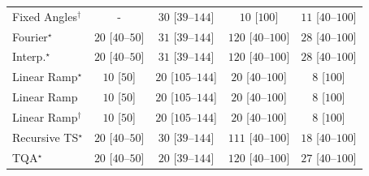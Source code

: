 \begin{tabular}{l|cccc|}
Fixed Angles$^\dagger$ & {\cellcolor[HTML]{000000}} \color[HTML]{F1F1F1} {\cellcolor{white}} \color{black} - & {\cellcolor[HTML]{F3FAF0}} \color[HTML]{000000} $30$ [$39$--$144$] & {\cellcolor[HTML]{F7FCF5}} \color[HTML]{000000} $10$ [$100$] & {\cellcolor[HTML]{F6FCF4}} \color[HTML]{000000} $11$ [$40$--$100$] \\
Fourier$^\star$ & {\cellcolor[HTML]{F5FBF2}} \color[HTML]{000000} $20$ [$40$--$50$] & {\cellcolor[HTML]{F3FAF0}} \color[HTML]{000000} $31$ [$39$--$144$] & {\cellcolor[HTML]{E0F3DB}} \color[HTML]{000000} $120$ [$40$--$100$] & {\cellcolor[HTML]{F4FBF1}} \color[HTML]{000000} $28$ [$40$--$100$] \\
Interp.$^\star$ & {\cellcolor[HTML]{F5FBF2}} \color[HTML]{000000} $20$ [$40$--$50$] & {\cellcolor[HTML]{F3FAF0}} \color[HTML]{000000} $31$ [$39$--$144$] & {\cellcolor[HTML]{E0F3DB}} \color[HTML]{000000} $120$ [$40$--$100$] & {\cellcolor[HTML]{F4FBF1}} \color[HTML]{000000} $28$ [$40$--$100$] \\
Linear Ramp$^\star$ & {\cellcolor[HTML]{F7FCF5}} \color[HTML]{000000} $10$ [$50$] & {\cellcolor[HTML]{F5FBF2}} \color[HTML]{000000} $20$ [$105$--$144$] & {\cellcolor[HTML]{F5FBF2}} \color[HTML]{000000} $20$ [$40$--$100$] & {\cellcolor[HTML]{F7FCF5}} \color[HTML]{000000} $8$ [$100$] \\
Linear Ramp & {\cellcolor[HTML]{F7FCF5}} \color[HTML]{000000} $10$ [$50$] & {\cellcolor[HTML]{F5FBF2}} \color[HTML]{000000} $20$ [$105$--$144$] & {\cellcolor[HTML]{F5FBF2}} \color[HTML]{000000} $20$ [$40$--$100$] & {\cellcolor[HTML]{F7FCF5}} \color[HTML]{000000} $8$ [$100$] \\
Linear Ramp$^\dagger$ & {\cellcolor[HTML]{F7FCF5}} \color[HTML]{000000} $10$ [$50$] & {\cellcolor[HTML]{F5FBF2}} \color[HTML]{000000} $20$ [$105$--$144$] & {\cellcolor[HTML]{F5FBF2}} \color[HTML]{000000} $20$ [$40$--$100$] & {\cellcolor[HTML]{F7FCF5}} \color[HTML]{000000} $8$ [$100$] \\
Recursive TS$^\star$ & {\cellcolor[HTML]{F5FBF2}} \color[HTML]{000000} $20$ [$40$--$50$] & {\cellcolor[HTML]{F3FAF0}} \color[HTML]{000000} $30$ [$39$--$144$] & {\cellcolor[HTML]{E3F4DE}} \color[HTML]{000000} $111$ [$40$--$100$] & {\cellcolor[HTML]{F5FBF3}} \color[HTML]{000000} $18$ [$40$--$100$] \\
TQA$^\star$ & {\cellcolor[HTML]{F5FBF2}} \color[HTML]{000000} $20$ [$40$--$50$] & {\cellcolor[HTML]{F5FBF2}} \color[HTML]{000000} $20$ [$39$--$144$] & {\cellcolor[HTML]{E0F3DB}} \color[HTML]{000000} $120$ [$40$--$100$] & {\cellcolor[HTML]{F4FBF1}} \color[HTML]{000000} $27$ [$40$--$100$] \\

\end{tabular}
